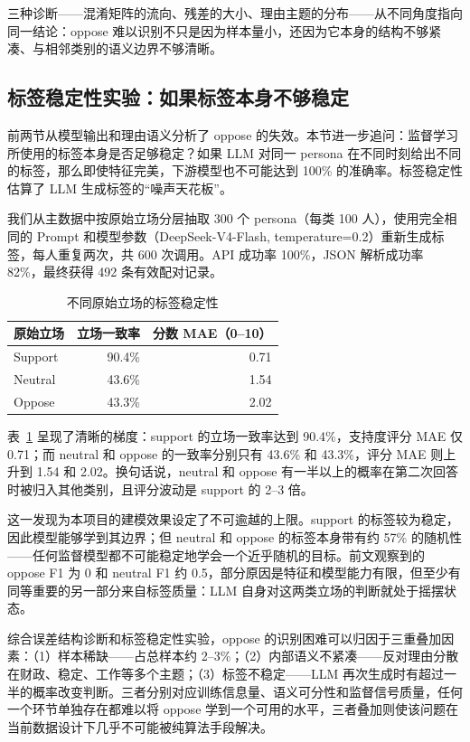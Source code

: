 \documentclass[11pt,a4paper]{ctexart}
\begin{document}
三种诊断——混淆矩阵的流向、残差的大小、理由主题的分布——从不同角度指向同一结论：oppose 难以识别不只是因为样本量小，还因为它本身的结构不够紧凑、与相邻类别的语义边界不够清晰。

\subsection{标签稳定性实验：如果标签本身不够稳定}
前两节从模型输出和理由语义分析了 oppose 的失效。本节进一步追问：监督学习所使用的标签本身是否足够稳定？如果 LLM 对同一 persona 在不同时刻给出不同的标签，那么即使特征完美，下游模型也不可能达到 100\% 的准确率。标签稳定性估算了 LLM 生成标签的“噪声天花板”。

我们从主数据中按原始立场分层抽取 300 个 persona（每类 100 人），使用完全相同的 Prompt 和模型参数（DeepSeek-V4-Flash, temperature=0.2）重新生成标签，每人重复两次，共 600 次调用。API 成功率 100\%，JSON 解析成功率 82\%，最终获得 492 条有效配对记录。

\begin{table}[htbp]
\centering
\caption{不同原始立场的标签稳定性}
\label{tab:stability}
\begin{tabular}{lrr}
\toprule
原始立场 & 立场一致率 & 分数 MAE（0--10） \\
\midrule
Support & 90.4\% & 0.71 \\
Neutral & 43.6\% & 1.54 \\
Oppose & 43.3\% & 2.02 \\
\bottomrule
\end{tabular}
\end{table}

表~\ref{tab:stability} 呈现了清晰的梯度：support 的立场一致率达到 90.4\%，支持度评分 MAE 仅 0.71；而 neutral 和 oppose 的一致率分别只有 43.6\% 和 43.3\%，评分 MAE 则上升到 1.54 和 2.02。换句话说，neutral 和 oppose 有一半以上的概率在第二次回答时被归入其他类别，且评分波动是 support 的 2--3 倍。

这一发现为本项目的建模效果设定了不可逾越的上限。support 的标签较为稳定，因此模型能够学到其边界；但 neutral 和 oppose 的标签本身带有约 57\% 的随机性——任何监督模型都不可能稳定地学会一个近乎随机的目标。前文观察到的 oppose F1 为 0 和 neutral F1 约 0.5，部分原因是特征和模型能力有限，但至少有同等重要的另一部分来自标签质量：LLM 自身对这两类立场的判断就处于摇摆状态。

综合误差结构诊断和标签稳定性实验，oppose 的识别困难可以归因于三重叠加因素：（1）样本稀缺——占总样本约 2--3\%；（2）内部语义不紧凑——反对理由分散在财政、稳定、工作等多个主题；（3）标签不稳定——LLM 再次生成时有超过一半的概率改变判断。三者分别对应训练信息量、语义可分性和监督信号质量，任何一个环节单独存在都难以将 oppose 学到一个可用的水平，三者叠加则使该问题在当前数据设计下几乎不可能被纯算法手段解决。
\end{document}
